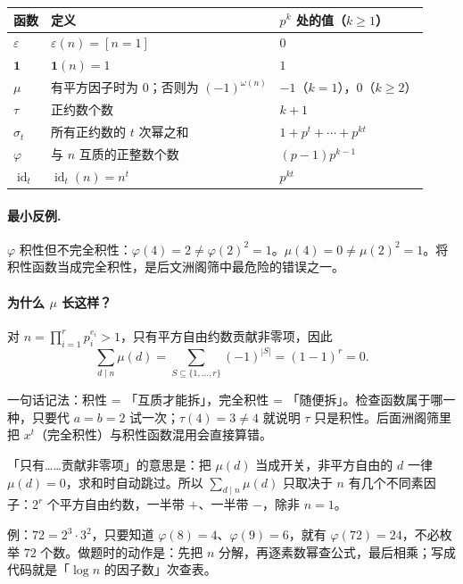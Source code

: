 \documentclass[UTF8,a4paper,11pt,oneside,openany,fontset=fandol]{ctexbook}
\theoremstyle{definition}
\newcommand{\eps}{\varepsilon}
\newcommand{\one}{\mathbf 1}
\newcommand{\id}{\operatorname{id}}
\begin{document}
\begin{longtable}{p{}p{}p{}}
\toprule
函数 & 定义 & $p^k$ 处的值（$k\ge1$）\\\midrule
$\eps$ & $\eps(n)=[n=1]$ & $0$\\
$\one$ & $\one(n)=1$ & $1$\\
$\mu$ & 有平方因子时为 $0$；否则为 $(-1)^{\omega(n)}$ & $-1$（$k=1$），$0$（$k\ge2$）\\
$\tau$ & 正约数个数 & $k+1$\\
$\sigma_t$ & 所有正约数的 $t$ 次幂之和 & $1+p^t+\cdots+p^{kt}$\\
$\varphi$ & 与 $n$ 互质的正整数个数 & $(p-1)p^{k-1}$\\
$\id_t$ & $\id_t(n)=n^t$ & $p^{kt}$\\
\bottomrule
\end{longtable}

\paragraph{最小反例.} $\varphi$ 积性但不完全积性：$\varphi(4)=2\ne\varphi(2)^2=1$。$\mu(4)=0\ne\mu(2)^2=1$。将积性函数当成完全积性，是后文洲阁筛中最危险的错误之一。
\paragraph{为什么 $\mu$ 长这样？}
对 $n=\prod_{i=1}^r p_i^{e_i}>1$，只有平方自由约数贡献非零项，因此
\[
 \sum_{d\mid n}\mu(d)=\sum_{S\subseteq\{1,\ldots,r\}}(-1)^{|S|}=(1-1)^r=0.
\]

\begin{tip}
一句话记法：积性 = 「互质才能拆」，完全积性 = 「随便拆」。检查函数属于哪一种，只要代 $a=b=2$ 试一次；$\tau(4)=3\ne4$ 就说明 $\tau$ 只是积性。后面洲阁筛里把 $x^t$（完全积性）与积性函数混用会直接算错。
\end{tip}

\begin{tip}
「只有……贡献非零项」的意思是：把 $\mu(d)$ 当成开关，非平方自由的 $d$ 一律 $\mu(d)=0$，求和时自动跳过。所以 $\sum_{d\mid n}\mu(d)$ 只取决于 $n$ 有几个不同素因子：$2^r$ 个平方自由约数，一半带 $+$、一半带 $-$，除非 $n=1$。
\end{tip}

\begin{tip}
例：$72=2^3\cdot3^2$，只要知道 $\varphi(8)=4$、$\varphi(9)=6$，就有 $\varphi(72)=24$，不必枚举 $72$ 个数。做题时的动作是：先把 $n$ 分解，再逐素数幂查公式，最后相乘；写成代码就是「$\log n$ 的因子数」次查表。
\end{tip}
\end{document}
